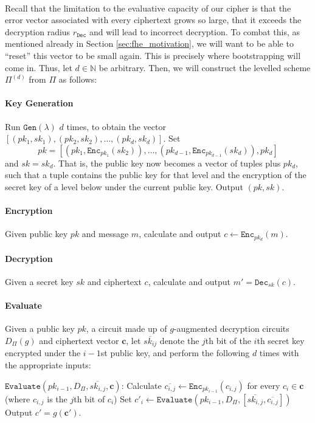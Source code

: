 \documentclass{article}
\theoremstyle{definition}
\theoremstyle{example}
\newcommand{\Enc}{\texttt{Enc}}
\newcommand{\Dec}{\texttt{Dec}}
\newcommand{\Gen}{\texttt{Gen}}
\newcommand{\Evaluate}{\texttt{Evaluate}}
\newcommand{\Nat}{\mathbb{N}}
\renewcommand{\vec}[1]{\mathbf{#1}}
\begin{document}
\paragraph{} Recall that the limitation to the evaluative capacity of our cipher
is that the error vector associated with every ciphertext grows so large, that
it exceeds the decryption radius $r_\Dec$ and will lead to incorrect decryption.
To combat this, as mentioned already in Section \ref{sec:fhe_motivation}, we
will want to be able to ``reset'' this vector to be small again. This is
precisely where bootstrapping will come in.
Thus, let $d \in \Nat$ be arbitrary. Then, we will construct the 
levelled scheme $\Pi^{(d)}$ from $\Pi$ as follows:
\paragraph{Key Generation} Run $\Gen(\lambda)$ $d$ times, to obtain the vector
$[(pk_1, sk_1), (pk_2, sk_2), \hdots, (pk_d, sk_d)]$. Set 
\[
pk = [(pk_1,\Enc_{pk_1}(sk_2)), \hdots, (pk_{d-1}, \Enc_{pk_{d-1}}(sk_d)), pk_d]  
\]
and $sk = sk_d$. That is, the public key now becomes a vector of tuples plus
$pk_d$, such that a tuple contains the public key for that level and the
encryption of the secret key of a level below under the current public key.
Output $(pk, sk)$.
\paragraph{Encryption} Given public key $pk$ and message $m$, calculate and
output $c\leftarrow \Enc_{pk_d}(m)$.
\paragraph{Decryption} Given a secret key $sk$ and ciphertext $c$, calculate and
output $m' = \Dec_{sk}(c)$.
\paragraph{Evaluate} Given a public key $pk$, a circuit made up of $g$-augmented decryption circuits
$D_\Pi(g)$ and ciphertext vector $\vec{c}$, let $\overline{sk_{ij}}$ denote the $j$th bit of the $i$th secret
key encrypted under the $i - 1$st public key, and perform the following $d$
times with the appropriate inputs:\\
\begin{algorithmic}
  \State $\Evaluate(pk_{i-1}, D_\Pi, \overline{sk_{i,j}}, \vec{c})$:
  \State \quad Calculate $\overline{c_{i,j}} \leftarrow \Enc_{pk_{i-1}}(c_{i,j})$ for
  every $c_i \in \vec{c}$
  \quad (where $c_{i, j}$ is the $j$th bit of $c_i$)
  \State \quad Set $c'_i \leftarrow \Evaluate(pk_{i-1}, D_\Pi, [\overline{sk_{i,
      j}}, \overline{c_{i, j}}])$
  \State \quad Output $c' = g(\vec{c}')$.
  \State
\end{algorithmic}
\end{document}
